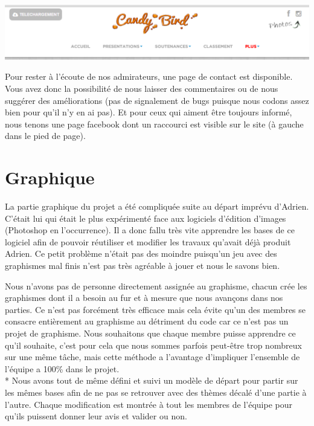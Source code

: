 \documentclass [11pt]{report}
\begin{document}
	\begin{center}
	\includegraphics[scale=0.5]{images/site.png}
	\end{center}
	
	\vspace{10mm}
	
	Pour rester à l'écoute de nos admirateurs, une page de contact est disponible. Vous avez donc la possibilité de nous laisser des commentaires ou de nous suggérer des améliorations (pas de signalement de bugs puisque nous codons assez bien pour qu'il n'y en ai pas). Et pour ceux qui aiment être toujours informé, nous tenons une page facebook dont un raccourci est visible sur le site (à gauche dans le pied de page).
	
	\vspace{10mm}
	
	\newpage
	
	\section{Graphique}
	La partie graphique du projet a été compliquée suite au départ imprévu d'Adrien. C'était lui qui était le plus expérimenté face aux logiciels d'édition d'images (Photoshop en l'occurrence). Il a donc fallu  très vite apprendre les bases de ce logiciel afin de pouvoir réutiliser et modifier les travaux qu'avait déjà produit Adrien. Ce petit problème n'était pas des moindre puisqu'un jeu avec des graphismes mal finis n'est pas très agréable à jouer et nous le savons bien.
	
	\indent Nous n'avons pas de personne directement assignée au graphisme, chacun crée les graphismes dont il a besoin au fur et à mesure que nous avançons dans nos parties. Ce n'est pas forcément très efficace mais cela évite qu'un des membres se consacre entièrement au graphisme au détriment du code car ce n'est pas un projet de graphisme. Nous souhaitons que chaque membre puisse apprendre ce qu'il souhaite, c'est pour cela que nous sommes parfois peut-être trop nombreux sur une même tâche, mais cette méthode a l'avantage d'impliquer l'ensemble de l'équipe a 100\% dans le projet.\\*
	\indent Nous avons tout de même défini et suivi un modèle de départ pour partir sur les mêmes bases afin de ne pas se retrouver avec des thèmes décalé d'une partie à l'autre. Chaque modification est montrée à tout les membres de l'équipe pour qu'ils puissent donner leur avis et valider ou non.
	
\end{document}

